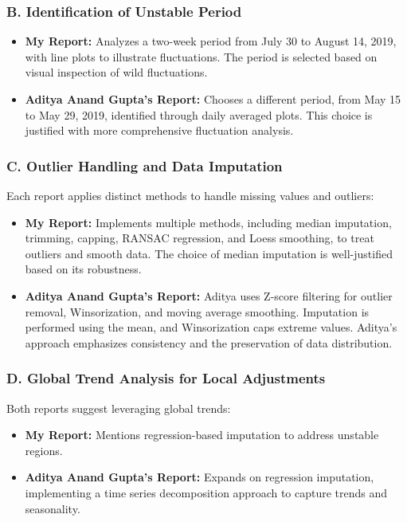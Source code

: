 \subsubsection*{B. Identification of Unstable Period}
\begin{itemize}
    \item \textbf{My Report:} Analyzes a two-week period from July 30 to August 14, 2019, with line plots to illustrate fluctuations. The period is selected based on visual inspection of wild fluctuations.
    \item \textbf{Aditya Anand Gupta's Report:} Chooses a different period, from May 15 to May 29, 2019, identified through daily averaged plots. This choice is justified with more comprehensive fluctuation analysis.
\end{itemize}

\subsubsection*{C. Outlier Handling and Data Imputation}
Each report applies distinct methods to handle missing values and outliers:
\begin{itemize}
    \item \textbf{My Report:} Implements multiple methods, including median imputation, trimming, capping, RANSAC regression, and Loess smoothing, to treat outliers and smooth data. The choice of median imputation is well-justified based on its robustness.
    \item \textbf{Aditya Anand Gupta's Report:} Aditya uses Z-score filtering for outlier removal, Winsorization, and moving average smoothing. Imputation is performed using the mean, and Winsorization caps extreme values. Aditya’s approach emphasizes consistency and the preservation of data distribution.
\end{itemize}

\subsubsection*{D. Global Trend Analysis for Local Adjustments}
Both reports suggest leveraging global trends:
\begin{itemize}
    \item \textbf{My Report:} Mentions regression-based imputation to address unstable regions.
    \item \textbf{Aditya Anand Gupta's Report:} Expands on regression imputation, implementing a time series decomposition approach to capture trends and seasonality.
\end{itemize}

